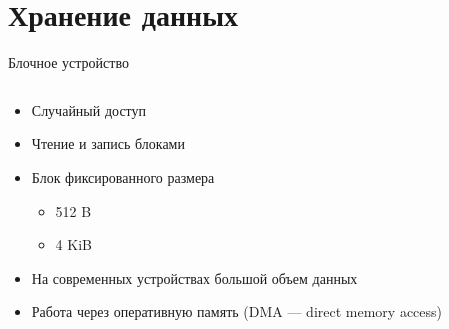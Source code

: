 \documentclass[aspectratio=169]{beamer}
\begin{document}
\section{Хранение данных}
\begin{frame}{Блочное устройство}
\begin{columns}
    \begin{column}{.4\textwidth}
        \begin{itemize}
            \item Случайный доступ
            \item Чтение и запись блоками
            \item Блок фиксированного размера
            \begin{itemize}
                \item 512 B
                \item 4 KiB
            \end{itemize}
            \item На современных устройствах большой объем данных
            \item Работа через оперативную память (DMA --- direct memory access)
        \end{itemize}
    \end{column}
    
    \begin{column}{.3\textwidth}
        \dma
    \end{column}
    

\end{columns}
\end{frame}
\end{document}
